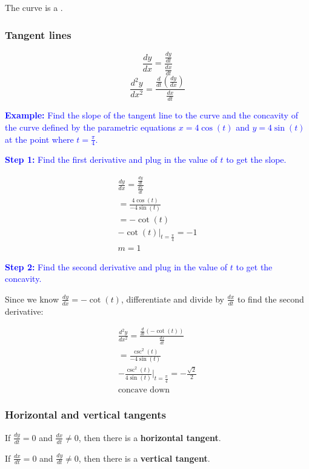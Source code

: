\documentclass[letterpaper, 12pt]{article}
\newcommand{\example}[1]{\textcolor{blue}{\textbf{Example:} #1}}
\newcommand{\step}[2]{\textcolor{blue}{\textbf{Step #1:} #2}}
\begin{document}
The curve is a .

\subsubsection*{Tangent lines}

$$\frac{dy}{dx} = \frac{\frac{dy}{dt}}{\frac{dx}{dt}}$$
$$\frac{d^2y}{dx^2} = \frac{\frac{d}{dt}\left(\frac{dy}{dx}\right)}{\frac{dx}{dt}}$$

\example{Find the slope of the tangent line to the curve and the concavity of the curve defined by the parametric equations $x = 4\cos(t)$ and $y = 4\sin(t)$ at the point where $t = \frac{\pi}{4}$.}

\step{1}{Find the first derivative and plug in the value of $t$ to get the slope.}

\begin{gather*}
\frac{dy}{dx} = \frac{\frac{dy}{dt}}{\frac{dx}{dt}} \\
= \frac{4\cos(t)}{-4\sin(t)} \\
= -\cot(t) \\
-\cot(t)|_{t = \frac{\pi}{4}} = -1 \\
\boxed{m = 1}
\end{gather*}

\step{2}{Find the second derivative and plug in the value of $t$ to get the concavity.}

Since we know $\frac{dy}{dx} = -\cot(t)$, differentiate and divide by $\frac{dx}{dt}$ to find the second derivative:

\begin{gather*}
\frac{d^2y}{dx^2} = \frac{\frac{d}{dt}\left(-\cot(t)\right)}{\frac{dx}{dt}} \\
= \frac{\csc^2(t)}{-4\sin(t)} \\
-\frac{\csc^2(t)}{4\sin(t)}|_{t = \frac{\pi}{4}} = -\frac{\sqrt{2}}{2} \\
\boxed{\text{concave down}}
\end{gather*}

\subsubsection*{Horizontal and vertical tangents}

If $\frac{dy}{dt} = 0$ and $\frac{dx}{dt} \neq 0$, then there is a \textbf{horizontal tangent}.

If $\frac{dx}{dt} = 0$ and $\frac{dy}{dt} \neq 0$, then there is a \textbf{vertical tangent}.
\end{document}
